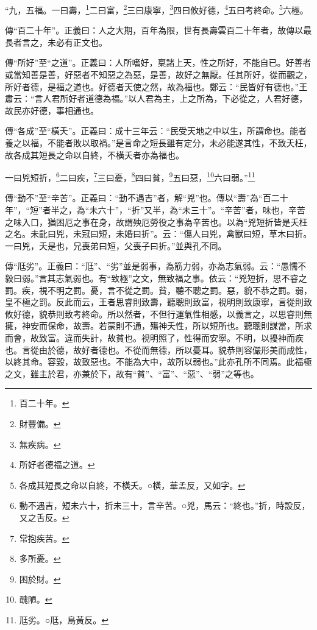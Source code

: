 “九，五福。一曰壽，\footnote{百二十年。}二曰富，\footnote{財豐備。}三曰康寧，\footnote{無疾病。}四曰攸好德，\footnote{所好者德福之道。}五曰考終命。\footnote{各成其短長之命以自終，不橫夭。○橫，華孟反，又如字。}六極。


{\noindent\zhuan{}\fzbyks 傳“百二十年”。正義曰：人之大期，百年為限，世有長壽雲百二十年者，故傳以最長者言之，未必有正文也。 \par}

{\noindent\zhuan{}\fzbyks 傳“所好”至“之道”。正義曰：人所嗜好，稟諸上天，性之所好，不能自已。好善者或當知善是善，好惡者不知惡之為惡，是善，故好之無厭。任其所好，從而觀之，所好者德，是福之道也。好德者天使之然，故為福也。鄭云：“民皆好有德也。”王肅云：“言人君所好者道德為福。”以人君為主，上之所為，下必從之，人君好德，故民亦好德，事相通也。 \par}

{\noindent\zhuan{}\fzbyks 傳“各成”至“橫夭”。正義曰：成十三年云：“民受天地之中以生，所謂命也。能者養之以福，不能者敗以取禍。”是言命之短長雖有定分，未必能遂其性，不致夭枉，故各成其短長之命以自終，不橫夭者亦為福也。 \par}

一曰兇短折，\footnote{動不遇吉，短未六十，折未三十，言辛苦。○兇，馬云：“終也。”折，時設反，又之舌反。}二曰疾，\footnote{常抱疾苦。}三曰憂，\footnote{多所憂。}四曰貧，\footnote{困於財。}五曰惡，\footnote{醜陋。}六曰弱。”\footnote{尫劣。○尫，鳥黃反。}

{\noindent\zhuan{}\fzbyks 傳“動不”至“辛苦”。正義曰：“動不遇吉”者，解“兇”也。傳以“壽”為“百二十年”，“短”者半之，為“未六十”，“折”又半，為“未三十”。“辛苦”者，味也，辛苦之味入口，猶困厄之事在身，故謂殃厄勞役之事為辛苦也。以為“兇短折皆是夭枉之名。未齔曰兇，未冠曰短，未婚曰折”。云：“傷人曰兇，禽獸曰短，草木曰折。一曰兇，夭是也，兄喪弟曰短，父喪子曰折。”並與孔不同。 \par}

{\noindent\zhuan{}\fzbyks 傳“尫劣”。正義曰：“尫”、“劣”並是弱事，為筋力弱，亦為志氣弱。云：“愚懦不毅曰弱。”言其志氣弱也。有“致極”之文，無致福之事。依云：“兇短折，思不睿之罰。疾，視不明之罰。憂，言不從之罰。貧，聽不聰之罰。惡，貌不恭之罰。弱，皇不極之罰。反此而云，王者思睿則致壽，聽聰則致富，視明則致康寧，言從則致攸好德，貌恭則致考終命。所以然者，不但行運氣性相感，以義言之，以思睿則無擁，神安而保命，故壽。若蒙則不通，殤神夭性，所以短所也。聽聰則謀當，所求而會，故致富。違而失計，故貧也。視明照了，性得而安寧。不明，以擾神而疾也。言從由於德，故好者德也。不從而無德，所以憂耳。貌恭則容儼形美而成性，以終其命。容毀，故致惡也。不能為大中，故所以弱也。”此亦孔所不同焉。此福極之文，雖主於君，亦兼於下，故有“貧”、“富”、“惡”、“弱”之等也。 \par}

